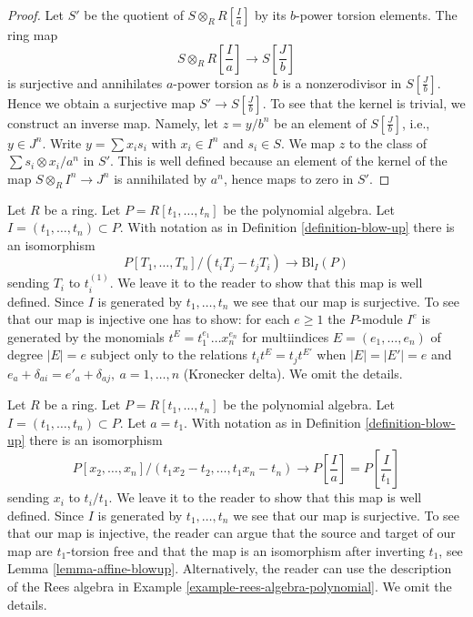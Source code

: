 \begin{proof}
Let $S'$ be the quotient of $S \otimes_R R[\frac{I}{a}]$ by its
$b$-power torsion elements. The ring map
$$
S \otimes_R R[\textstyle{\frac{I}{a}}]
\longrightarrow
S[\textstyle{\frac{J}{b}}]
$$
is surjective and annihilates $a$-power torsion as $b$ is a nonzerodivisor
in $S[\frac{J}{b}]$. Hence we obtain a surjective map $S' \to S[\frac{J}{b}]$.
To see that the kernel is trivial, we construct an inverse map. Namely, let
$z = y/b^n$ be an element of $S[\frac{J}{b}]$, i.e., $y \in J^n$.
Write $y = \sum x_is_i$ with $x_i \in I^n$ and $s_i \in S$.
We map $z$ to the class of $\sum s_i \otimes x_i/a^n$ in
$S'$. This is well defined because an element of the kernel of the map
$S \otimes_R I^n \to J^n$ is annihilated by $a^n$, hence maps to zero in $S'$.
\end{proof}

\begin{example}
\label{example-rees-algebra-polynomial}
Let $R$ be a ring. Let $P = R[t_1, \ldots, t_n]$ be the polynomial algebra.
Let $I = (t_1, \ldots, t_n) \subset P$. With notation as in
Definition \ref{definition-blow-up} there is an isomorphism
$$
P[T_1, \ldots, T_n]/(t_iT_j - t_jT_i) \longrightarrow \text{Bl}_I(P)
$$
sending $T_i$ to $t_i^{(1)}$. We leave it to the reader to show that
this map is well defined. Since $I$ is generated by $t_1, \ldots, t_n$
we see that our map is surjective. To see that our map is injective
one has to show: for each $e \geq 1$ the $P$-module $I^e$ is generated
by the monomials $t^E = t_1^{e_1} \ldots x_n^{e_n}$ for multiindices
$E = (e_1, \ldots, e_n)$ of degree $|E| = e$ subject only to the
relations $t_i t^E = t_j t^{E'}$ when $|E| = |E'| = e$ and
$e_a + \delta_{a i} = e'_a + \delta_{a j},\ a = 1, \ldots, n$
(Kronecker delta). We omit the details.
\end{example}

\begin{example}
\label{example-affine-blowup-algebra-polynomial}
Let $R$ be a ring. Let $P = R[t_1, \ldots, t_n]$ be the polynomial algebra.
Let $I = (t_1, \ldots, t_n) \subset P$. Let $a = t_1$. With notation as in
Definition \ref{definition-blow-up} there is an isomorphism
$$
P[x_2, \ldots, x_n]/(t_1x_2 - t_2, \ldots, t_1x_n - t_n)
\longrightarrow
\textstyle{P[\frac{I}{a}] = P[\frac{I}{t_1}]}
$$
sending $x_i$ to $t_i/t_1$. We leave it to the reader to show that
this map is well defined. Since $I$ is generated by $t_1, \ldots, t_n$
we see that our map is surjective. To see that our map is injective,
the reader can argue that the source and target of our map are
$t_1$-torsion free and that the map is an isomorphism after inverting
$t_1$, see Lemma \ref{lemma-affine-blowup}. Alternatively, the reader
can use the description of the Rees algebra in
Example \ref{example-rees-algebra-polynomial}.
We omit the details.
\end{example}

